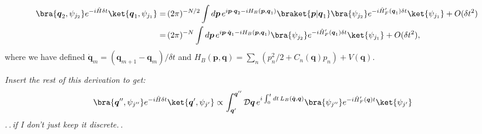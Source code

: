 \documentclass{report}
\begin{document}
\begin{align}
\begin{aligned}
	\bra{\boldsymbol{q}_2, \psi_{j_2}} e^{-i \hat H \delta t} \ket{\boldsymbol{q}_1 , \psi_{j_1}} 
	=&\,
		(2\pi)^{-N/2}
		\int d \boldsymbol{p}\, 
		e^{i \boldsymbol{p} \cdot \boldsymbol{q}_2 - i H_B(\boldsymbol{p}, \boldsymbol{q}_1)}
		\braket{\boldsymbol{p} | \boldsymbol{q}_1}
		\bra{\psi_{j_2}}  e^{-i \hat H'_F(\boldsymbol{q}_1) \delta t} \ket{\psi_{j_1}}
		+ O(\delta t^2)
	\\=&\,
		(2\pi)^{-N}
		\int d \boldsymbol{p}\, 
		e^{i \boldsymbol{p} \cdot \dot{\boldsymbol{q}}_1 - i H_B(\boldsymbol{p}, \boldsymbol{q}_1)}
		\bra{\psi_{j_2}}  e^{-i \hat H'_F(\boldsymbol{q}_1) \delta t} \ket{\psi_{j_1}}
		+ O(\delta t^2),
\end{aligned}
\end{align} 
where we have defined $\dot{\boldsymbol{q}}_m = (\boldsymbol{q}_{m+1} - \boldsymbol{q}_{m}) / \delta t$ and $H_B(\boldsymbol{p}, \boldsymbol{q}) = \sum_n(p_n^2 / 2 + C_n(\boldsymbol{q}) p_n) + V(\boldsymbol{q})$. 

%

\textit{Insert the rest of this derivation to get:}
\begin{align}
\begin{aligned}
	\bra{\boldsymbol{q}'', \psi_{j''}} e^{-i \hat H \delta t} \ket{\boldsymbol{q}' , \psi_{j'}} 
	\propto&\,
		\int_{\boldsymbol{q}'}^{\boldsymbol{q}''} \mathcal{D} \boldsymbol{q}\, 
		e^{i \int_{0}^{t} d t\,  L_B(\dot{\boldsymbol{q}}, \boldsymbol{q})}
		\bra{\psi_{j''}}  e^{-i \hat H'_F(\boldsymbol{q}) t} \ket{\psi_{j'}}
\end{aligned}
\end{align} 
\textit{.\,.\,if I don't just keep it discrete.\,.} %
\end{document}
